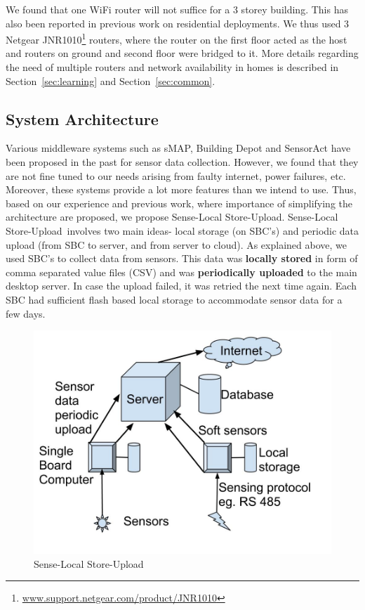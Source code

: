 \documentclass[10pt]{sensys-proc}
\newcommand{\secref}[1]{Section~\ref{#1}}
\newcommand{\paradigm}{Sense-Local Store-Upload}
\newcommand{\paradigms}{Sense-Local Store-Upload~}
\begin{document}
We found that one WiFi router will not suffice for a 3 storey building. This has also been reported in previous work on residential deployments\cite{hitchhiker_residential}. We thus used 3 Netgear JNR1010\footnote{\url{www.support.netgear.com/product/JNR1010}} routers, where the router on the first floor acted as the host and routers on ground and second floor were bridged to it. More details regarding the need of multiple routers and network availability in homes is described in \secref{sec:learning} and \secref{sec:common}.




\subsection{System Architecture}	
\label{sec:architecture}
Various middleware systems such as sMAP\cite{smap}, Building Depot\cite{buildingdepot} and SensorAct\cite{Arjunan12} have been proposed in the past for sensor data collection. However, we found that they are not fine tuned to our needs arising from faulty internet, power failures, etc. Moreover, these systems provide a lot more features than we intend to use. Thus, based on our experience and previous work\cite{hitchhiker_residential}, where importance of simplifying the architecture are proposed, we propose \paradigm. \paradigms involves two main ideas- local storage (on SBC's) and periodic data upload (from SBC to server, and from server to cloud). As explained above, we used SBC's to collect data from sensors. This data was \textbf{locally stored} in form of comma separated value files (CSV) and was \textbf{periodically uploaded} to the main desktop server. In case the upload failed, it was retried the next time again. Each SBC had sufficient flash based local storage to accommodate sensor data for a few days. 

\begin{figure}     
    \includegraphics[scale=0.20]{./figures/architecture.jpg}    
    \caption{\paradigm}   
    \label{fig:architecture}   
\end{figure}
\end{document}
